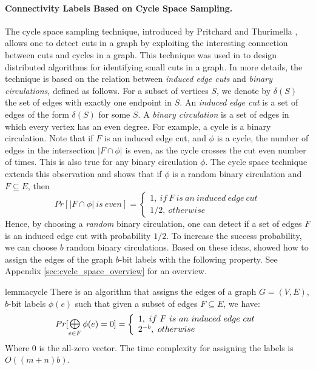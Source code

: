 \paragraph{Connectivity Labels Based on Cycle Space Sampling.} The cycle space sampling technique, introduced by Pritchard and Thurimella \cite{pritchard2011fast}, allows one to detect cuts in a graph by exploiting the interesting connection between cuts and cycles in a graph. This technique was used in \cite{pritchard2011fast} to design distributed algorithms for identifying small cuts in a graph. In more details, the technique is based on the relation between \emph{induced edge cuts} and \emph{binary circulations}, defined as follows. For a subset of vertices $S$, we denote by $\delta(S)$ the set of edges with exactly one endpoint in $S$. An \emph{induced edge cut} is a set of edges of the form $\delta(S)$ for some $S$. A \emph{binary circulation} is a set of edges in which every vertex has an even degree. For example, a cycle is a binary circulation. Note that if $F$ is an induced edge cut, and $\phi$ is a cycle, the number of edges in the intersection $|F \cap \phi|$ is even, as the cycle crosses the cut even number of times. This is also true for any binary circulation $\phi$. The cycle space technique extends this observation and shows that if $\phi$ is a random binary circulation and $F \subseteq E$, then
$$Pr[|F \cap \phi| \ is \ even] = \left\{
                \begin{array}{ll}
                  1,\ if\ F\ is\ an\ induced\ edge\ cut\\
                  1/2,\ otherwise
                \end{array}
              \right. $$ 
Hence, by choosing a \emph{random} binary circulation, one can detect if a set of edges $F$ is an induced edge cut with probability $1/2$.  To increase the success probability, we can choose $b$ random binary circulations. 
Based on these ideas, \cite{pritchard2011fast} showed how to assign the edges of the graph $b$-bit labels with the following property.  See Appendix \ref{sec:cycle_space_overview} for an overview.

\begin{restatable}{lemma}{cycle} \label{cycle_space_lemma}
There is an algorithm that assigns the edges of a graph $G=(V,E)$, $b$-bit labels $\phi(e)$ such that given a subset of edges $F \subseteq E$, we have:
$$Pr[\Moplus_{e \in F} \phi(e) = 0] = \left\{
                \begin{array}{ll}
                  1,\ if\ F\ is\ an\ induced\ edge\ cut\\
                  2^{-b},\ otherwise
                \end{array}
              \right. $$ 
Where $0$ is the all-zero vector. The time complexity for assigning the labels is $O((m+n)b)$.
\end{restatable}

